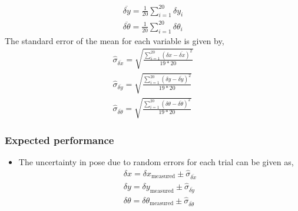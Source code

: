 \documentclass[11pt,a4paper,openright,twoside]{extreport}
\begin{document}
\begin{itemize}
\begin{align*}
\overline{\delta y} = \frac{1}{20} \sum_{i=1}^{20} \delta y_i \\
\overline{\delta \theta} = \frac{1}{20} \sum_{i=1}^{20} \delta \theta_i
\end{align*}
The standard error of the mean for each variable is given by,
\begin{align*}
\hat{\sigma}_{\overline{\delta x}} = \sqrt{\frac{\sum_{i=1}^{20} (\delta x - \overline{\delta x})^2}{19 * 20}} \\
\hat{\sigma}_{\overline{\delta y}} = \sqrt{\frac{\sum_{i=1}^{20} (\delta y - \overline{\delta y})^2}{19 * 20}} \\
\hat{\sigma}_{\overline{\delta \theta}} = \sqrt{\frac{\sum_{i=1}^{20} (\delta \theta - \overline{\delta \theta})^2}{19 * 20}}
\end{align*}
\end{itemize}

\subsubsection*{Expected performance}
\begin{itemize} 
\item The uncertainty in pose due to random errors for each trial can be given as,
\begin{align*}
\delta x = \delta x_{\text{measured}} \pm \hat{\sigma}_{\overline{\delta x}} \\
\delta y = \delta y_{\text{measured}} \pm \hat{\sigma}_{\overline{\delta y}} \\
\delta \theta = \delta \theta_{\text{measured}} \pm \hat{\sigma}_{\overline{\delta \theta}}
\end{align*}
\end{itemize}
\end{document}
